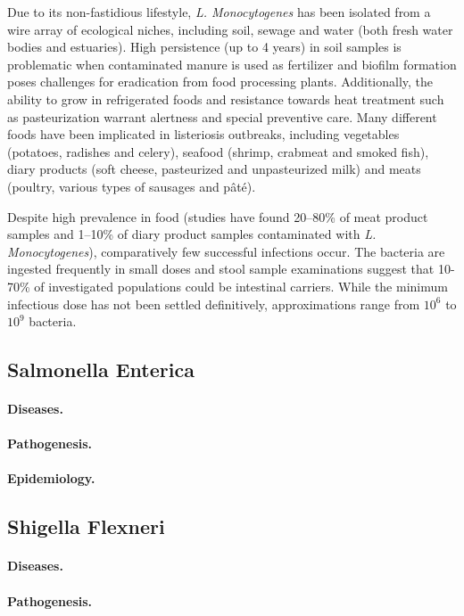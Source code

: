 Due to its non-fastidious lifestyle, \textit{L. Monocytogenes} has been isolated from a wire array of ecological niches, including soil, sewage and water (both fresh water bodies and estuaries). High persistence (up to 4 years) in soil samples is problematic when contaminated manure is used as fertilizer and biofilm formation poses challenges for eradication from food processing plants. Additionally, the ability to grow in refrigerated foods and resistance towards heat treatment such as pasteurization warrant alertness and special preventive care. Many different foods have been implicated in listeriosis outbreaks, including vegetables (potatoes, radishes and celery), seafood (shrimp, crabmeat and smoked fish), diary products (soft cheese, pasteurized and unpasteurized milk) and meats (poultry, various types of sausages and pâté).

Despite high prevalence in food (studies have found 20--80\% of meat product samples and 1--10\% of diary product samples contaminated with \textit{L. Monocytogenes}), comparatively few successful infections occur. The bacteria are ingested frequently in small doses and stool sample examinations suggest that 10-70\% of investigated populations could be intestinal carriers. While the minimum infectious dose has not been settled definitively, approximations range from $10^6$ to $10^9$ bacteria.

\subsection{Salmonella Enterica}
\paragraph{Diseases.}
\paragraph{Pathogenesis.}
\paragraph{Epidemiology.}

\subsection{Shigella Flexneri}
\paragraph{Diseases.}
\paragraph{Pathogenesis.}
